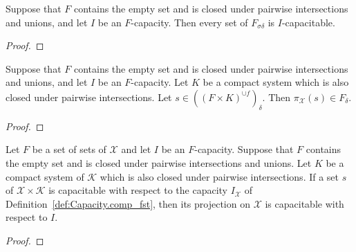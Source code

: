 \begin{lemma}\label{lem:isCapacitable_mem_countableInfClosure_countableSupClosure}
  \leanok
Suppose that $F$ contains the empty set and is closed under pairwise intersections and unions, and let $I$ be an $F$-capacity.
Then every set of $F_{\sigma \delta}$ is $I$-capacitable.
\end{lemma}

\begin{proof}\leanok

\end{proof}


\begin{lemma}\label{lem:mem_countableInfClosure_fst}
  \leanok
Suppose that $F$ contains the empty set and is closed under pairwise intersections and unions, and let $I$ be an $F$-capacity.
Let $K$ be a compact system which is also closed under pairwise intersections.
Let $s \in ((F \times K)^{\cup f})_\delta$.
Then $\pi_{\mathcal{X}}(s) \in F_\delta$.
\end{lemma}

\begin{proof}\leanok

\end{proof}


\begin{lemma}\label{lem:IsCapacitable.fst}
  \leanok
Let $F$ be a set of sets of $\mathcal{X}$ and let $I$ be an $F$-capacity.
Suppose that $F$ contains the empty set and is closed under pairwise intersections and unions.
Let $K$ be a compact system of $\mathcal{K}$ which is also closed under pairwise intersections.
If a set $s$ of $\mathcal{X} \times \mathcal{K}$ is capacitable with respect to the capacity $I_{\mathcal{X}}$ of Definition~\ref{def:Capacity.comp_fst}, then its projection on $\mathcal{X}$ is capacitable with respect to $I$.
\end{lemma}

\begin{proof}\leanok

\end{proof}



